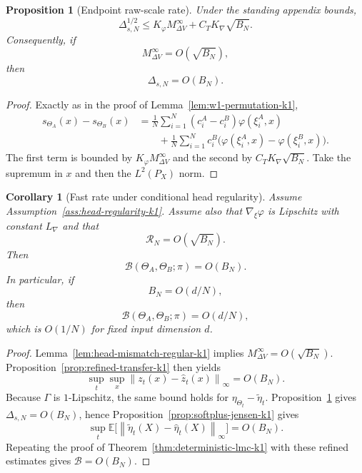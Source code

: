 \documentclass[11pt]{article}
\newtheorem{proposition}[theorem]{Proposition}
\newtheorem{corollary}[theorem]{Corollary}
\theoremstyle{definition}
\newcommand{\E}{\mathbb{E}}
\newcommand{\norm}[1]{\left\lVert #1 \right\rVert}
\newcommand{\mc}[1]{\mathcal{#1}}
\newcommand{\cB}{\mathcal{B}}
\begin{document}
\begin{proposition}[Endpoint raw-scale rate]
\label{prop:scale-rate-k1}
Under the standing appendix bounds,
\begin{equation}
  \Delta_{s,N}^{1/2}
  \le
  K_\varphi M_{\Delta V}^\infty + C_TK_{\nabla}\sqrt{B_N}.
  \label{eq:scale-rate-k1}
\end{equation}
Consequently, if
\[
  M_{\Delta V}^\infty=O(\sqrt{B_N}),
\]
then
\[
  \Delta_{s,N}=O(B_N).
\]
\end{proposition}

\begin{proof}
Exactly as in the proof of Lemma~\ref{lem:w1-permutation-k1},
\begin{align*}
  s_{\Theta_A}(x)-s_{\Theta_B}(x)
  &=
  \frac1N\sum_{i=1}^N
  (c_i^A-c_i^B)\varphi(\xi_i^A,x)
  \\
  &\qquad
  +
  \frac1N\sum_{i=1}^N
  c_i^B\bigl(\varphi(\xi_i^A,x)-\varphi(\xi_i^B,x)\bigr).
\end{align*}
The first term is bounded by $K_\varphi M_{\Delta V}^\infty$ and the second by
$C_TK_{\nabla}\sqrt{B_N}$. Take the supremum in $x$ and then the
$L^2(P_X)$ norm.
\end{proof}

\begin{corollary}[Fast rate under conditional head regularity]
\label{cor:fast-rate-k1}
Assume Assumption~\ref{ass:head-regularity-k1}. Assume also that
$\nabla_\xi\varphi$ is Lipschitz with constant $L_{\nabla}$ and that
\[
  \mc{R}_N=O(\sqrt{B_N}).
\]
Then
\[
  \cB(\Theta_A,\Theta_B;\pi)=O(B_N).
\]
In particular, if
\[
  B_N=O(d/N),
\]
then
\[
  \cB(\Theta_A,\Theta_B;\pi)=O(d/N),
\]
which is $O(1/N)$ for fixed input dimension $d$.
\end{corollary}

\begin{proof}
Lemma~\ref{lem:head-mismatch-regular-k1} implies
$M_{\Delta V}^\infty=O(\sqrt{B_N})$. Proposition~\ref{prop:refined-transfer-k1}
then yields
\[
  \sup_t\sup_x \norm{z_t(x)-\hat z_t(x)}_\infty = O(B_N).
\]
Because $\Gamma$ is $1$-Lipschitz, the same bound holds for
$\eta_{\Theta_t}-\tilde\eta_t$. Proposition~\ref{prop:scale-rate-k1} gives
$\Delta_{s,N}=O(B_N)$, hence Proposition~\ref{prop:softplus-jensen-k1} gives
\[
  \sup_t \E\big[\norm{\tilde\eta_t(X)-\hat\eta_t(X)}_\infty\big]=O(B_N).
\]
Repeating the proof of Theorem~\ref{thm:deterministic-lmc-k1} with these
refined estimates gives $\cB=O(B_N)$.
\end{proof}
\end{document}
